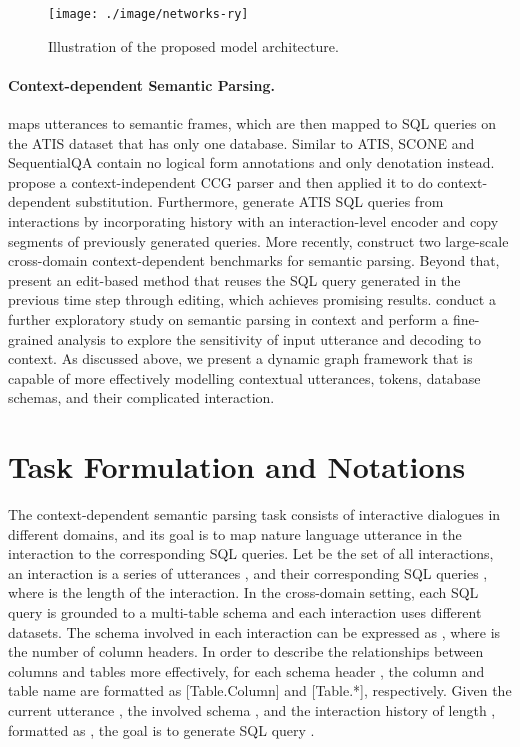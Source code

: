 \documentclass[letterpaper]{article} \usepackage{aaai21}  \usepackage{times}  \usepackage{helvet} \usepackage{courier}  \usepackage[hyphens]{url}  \usepackage{graphicx} \urlstyle{rm} \def\UrlFont{\rm}  \usepackage{natbib}  \usepackage{caption} \frenchspacing  \setlength{\pdfpagewidth}{8.5in}  \setlength{\pdfpageheight}{11in}
\begin{document}
\begin{figure*}
	\centering
	\texttt{[image: ./image/networks-ry]}
	\caption{Illustration of the proposed model architecture.}
	\label{arch}
\end{figure*}

\paragraph{Context-dependent Semantic Parsing.}
\citet{DBLP:conf/acl/MillerSBS96} maps utterances to semantic frames, which are then mapped to SQL
queries on the ATIS dataset \cite{DBLP:conf/naacl/HemphillGD90} that has only one database.
Similar to ATIS, SCONE \cite{DBLP:conf/acl/LongPL16,DBLP:conf/acl/GuuPLL17,DBLP:conf/naacl/FriedAK18,DBLP:conf/acl/ArtziS18,DBLP:conf/iclr/HuangCY19} and SequentialQA \cite{DBLP:conf/acl/IyyerYC17} contain no logical form annotations and only denotation \cite{Berant2014SemanticPV} instead.
\citet{DBLP:conf/acl/ZettlemoyerC09} propose a context-independent CCG parser and then applied
it to do context-dependent substitution.
Furthermore, \citet{DBLP:conf/naacl/SuhrIA18} generate ATIS SQL queries from interactions by incorporating history with an interaction-level encoder and copy segments of previously generated queries.
More recently, \citet{DBLP:conf/emnlp/YuZELXPLTSLJYSC19,DBLP:conf/acl/YuZYTLLELPCJDPS19} construct two large-scale cross-domain context-dependent benchmarks for semantic parsing.
Beyond that, \citet{DBLP:conf/emnlp/ZhangYESXLSXSR19} present
an edit-based method that reuses the SQL query generated in the previous time step through editing, which achieves promising results.
\citet{DBLP:conf/ijcai/LiuCGLZZ20} conduct a further exploratory study on semantic parsing in context and perform a fine-grained analysis to explore the sensitivity of input utterance and decoding to context.
As discussed above, we present a dynamic graph framework that is capable of more effectively modelling contextual utterances, tokens, database schemas, and their complicated interaction.


\section{Task Formulation and Notations}
The context-dependent semantic parsing task consists of interactive dialogues in different domains, and its goal is to map nature language utterance in the interaction to the corresponding SQL queries.
Let  be the set of all interactions, an interaction  is a series of utterances , and their corresponding SQL queries , where  is the length of the interaction.
In the cross-domain setting, each SQL query is grounded to a multi-table schema and each interaction uses different datasets.
The schema involved in each interaction can be expressed as , where  is the number of column headers.
In order to describe the relationships between columns and tables more effectively, for each schema header , the column and table name are formatted as [Table.Column] and [Table.*], respectively.
Given the current utterance , the involved schema , and the interaction history of length , formatted as , the goal is to generate SQL query .
\end{document}

